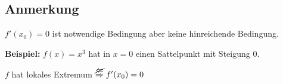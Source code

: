 \documentclass[10pt, a4paper, fleqn]{article}
\begin{document}
\subsection{Anmerkung}
$f'(x_0) = 0$ ist notwendige Bedingung aber keine hinreichende Bedingung.

\textbf{Beispiel: }
$f(x) = x^3$ hat in $x = 0$ einen Sattelpunkt mit Steigung $0$.
\bigskip

\begin{minipage}{0.4\textwidth}
\end{minipage}
\begin{minipage}{0.5\textwidth}
    $f$ hat lokales Extremum $\overset{\hbox{$\cancel{\Leftarrow}$}}{\Rightarrow} f'(x_0) = 0$
\end{minipage}
\end{document}
